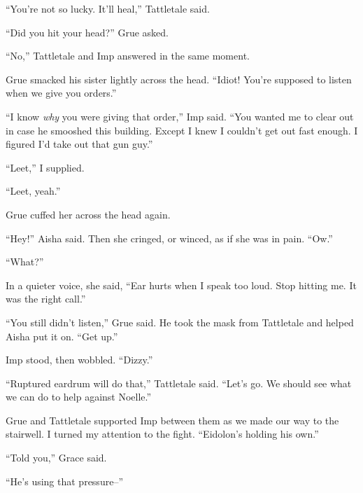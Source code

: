 ``You're not so lucky.  It'll heal,'' Tattletale said.



``Did you hit your head?'' Grue asked.



``No,'' Tattletale and Imp answered in the same moment.



Grue smacked his sister lightly across the head.  ``Idiot!  You're supposed to listen when we give you orders.''



``I know \emph{why} you were giving that order,'' Imp said.  ``You wanted me to clear out in case he smooshed this building.  Except I knew I couldn't get out fast enough.  I figured I'd take out that gun guy.''



``Leet,'' I supplied.



``Leet, yeah.''



Grue cuffed her across the head again.



``Hey!'' Aisha said.  Then she cringed, or winced, as if she was in pain.  ``Ow.''



``What?''



In a quieter voice, she said, ``Ear hurts when I speak too loud.  Stop hitting me.  It was the right call.''



``You still didn't listen,'' Grue said.  He took the mask from Tattletale and helped Aisha put it on.  ``Get up.''



Imp stood, then wobbled.  ``Dizzy.''



``Ruptured eardrum will do that,'' Tattletale said.  ``Let's go.  We should see what we can do to help against Noelle.''



Grue and Tattletale supported Imp between them as we made our way to the stairwell.  I turned my attention to the fight.  ``Eidolon's holding his own.''



``Told you,'' Grace said.



``He's using that pressure--''



